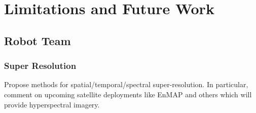 \chapter{Limitations and Future Work}

\section{Robot Team}

\subsection{Super Resolution}
Propose methods for spatial/temporal/spectral super-resolution. In particular, comment on upcoming satellite deployments like EnMAP and others which will provide hyperspectral imagery.


